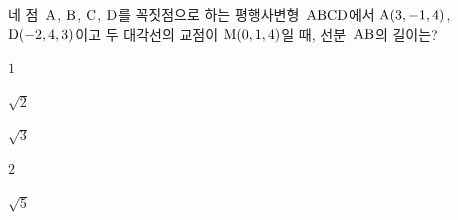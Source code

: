 네 점~$\mathrm{A}$, $\mathrm{B}$, $\mathrm{C}$, $\mathrm{D}$를 꼭짓점으로 하는 평행사변형~$\mathrm{ABCD}$에서 $\mathrm{A}(3{,}\mkern3mu\mathopen{}-1{,}\mkern3mu\mathopen{}4)$, $\mathrm{D}(-2{,}\mkern3mu\mathopen{}4{,}\mkern3mu\mathopen{}3)$이고 두 대각선의 교점이 $\mathrm{M}(0{,}\mkern3mu\mathopen{}1{,}\mkern3mu\mathopen{}4)$일 때, 선분~$\mathrm{AB}$의 길이는?
\begin{choices32}{\rule[-3ex]{0pt}{8ex}$1$}{\rule[-3ex]{0pt}{8ex}$\sqrt{2}$}{\rule[-3ex]{0pt}{8ex}$\sqrt{3}$}{\rule[-3ex]{0pt}{8ex}$2$}{\rule[-3ex]{0pt}{8ex}$\sqrt{5}$}\end{choices32}
